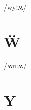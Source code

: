 \documentclass[10pt,a4paper,twoside]{book}
\begin{document}
\begin{multicols}{3}
 {/wyːʍ/} {}
\end{multicols}

\section*{Ẅ}

\begin{multicols}{3}
 {/ʍuːʍ/} {}
\end{multicols}

\section*{Y}
\end{document}
